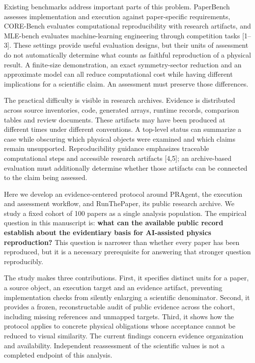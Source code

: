 \documentclass[10pt,a4paper]{article}
\begin{document}
Existing benchmarks address important parts of this problem. PaperBench
assesses implementation and execution against paper-specific
requirements, CORE-Bench evaluates computational reproducibility with
research artifacts, and MLE-bench evaluates machine-learning engineering
through competition tasks {[}1--3{]}. These settings provide useful
evaluation designs, but their units of assessment do not automatically
determine what counts as faithful reproduction of a physical result. A
finite-size demonstration, an exact symmetry-sector reduction and an
approximate model can all reduce computational cost while having
different implications for a scientific claim. An assessment must
preserve those differences.

The practical difficulty is visible in research archives. Evidence is
distributed across source inventories, code, generated arrays, runtime
records, comparison tables and review documents. These artifacts may
have been produced at different times under different conventions. A
top-level status can summarize a case while obscuring which physical
objects were examined and which claims remain unsupported.
Reproducibility guidance emphasizes traceable computational steps and
accessible research artifacts {[}4,5{]}; an archive-based evaluation
must additionally determine whether those artifacts can be connected to
the claim being assessed.

Here we develop an evidence-centered protocol around PRAgent, the
execution and assessment workflow, and RunThePaper, its public research
archive. We study a fixed cohort of 100 papers as a single analysis
population. The empirical question in this manuscript is: \textbf{what
can the available public record establish about the evidentiary basis
for AI-assisted physics reproduction?} This question is narrower than
whether every paper has been reproduced, but it is a necessary
prerequisite for answering that stronger question reproducibly.

The study makes three contributions. First, it specifies distinct units
for a paper, a source object, an execution target and an evidence
artifact, preventing implementation checks from silently enlarging a
scientific denominator. Second, it provides a frozen, reconstructable
audit of public evidence across the cohort, including missing references
and unmapped targets. Third, it shows how the protocol applies to
concrete physical obligations whose acceptance cannot be reduced to
visual similarity. The current findings concern evidence organization
and availability. Independent reassessment of the scientific values is
not a completed endpoint of this analysis.
\end{document}
